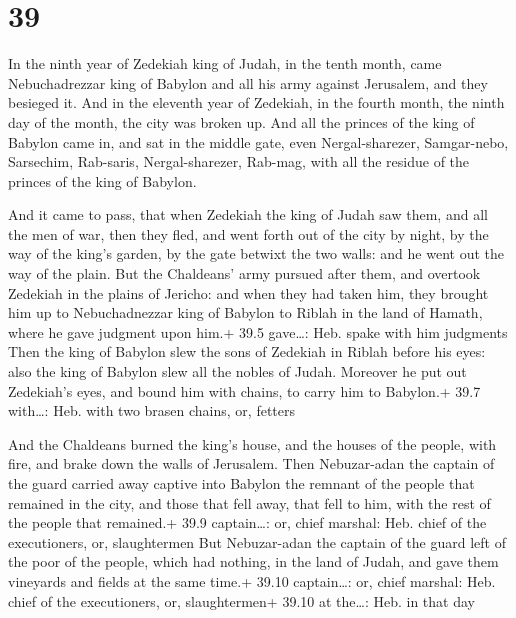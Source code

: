 \hypertarget{section-38}{%
\section{39}\label{section-38}}

 In the ninth year of Zedekiah king of Judah, in the tenth
month, came Nebuchadrezzar king of Babylon and all his army against
Jerusalem, and they besieged it.  And in the eleventh year
of Zedekiah, in the fourth month, the ninth day of the month, the city
was broken up.  And all the princes of the king of Babylon
came in, and sat in the middle gate, even Nergal-sharezer, Samgar-nebo,
Sarsechim, Rab-saris, Nergal-sharezer, Rab-mag, with all the residue of
the princes of the king of Babylon.

 And it came to pass, that when Zedekiah the king of Judah
saw them, and all the men of war, then they fled, and went forth out of
the city by night, by the way of the king's garden, by the gate betwixt
the two walls: and he went out the way of the plain.  But
the Chaldeans' army pursued after them, and overtook Zedekiah in the
plains of Jericho: and when they had taken him, they brought him up to
Nebuchadnezzar king of Babylon to Riblah in the land of Hamath, where he
gave judgment upon him.+ 39.5 gave\ldots: Heb. spake with him judgments
 Then the king of Babylon slew the sons of Zedekiah in
Riblah before his eyes: also the king of Babylon slew all the nobles of
Judah.  Moreover he put out Zedekiah's eyes, and bound him
with chains, to carry him to Babylon.+ 39.7 with\ldots: Heb. with two
brasen chains, or, fetters

 And the Chaldeans burned the king's house, and the houses
of the people, with fire, and brake down the walls of Jerusalem.
 Then Nebuzar-adan the captain of the guard carried away
captive into Babylon the remnant of the people that remained in the
city, and those that fell away, that fell to him, with the rest of the
people that remained.+ 39.9 captain\ldots: or, chief marshal: Heb. chief
of the executioners, or, slaughtermen  But Nebuzar-adan the
captain of the guard left of the poor of the people, which had nothing,
in the land of Judah, and gave them vineyards and fields at the same
time.+ 39.10 captain\ldots: or, chief marshal: Heb. chief of the
executioners, or, slaughtermen+ 39.10 at the\ldots: Heb. in that day

